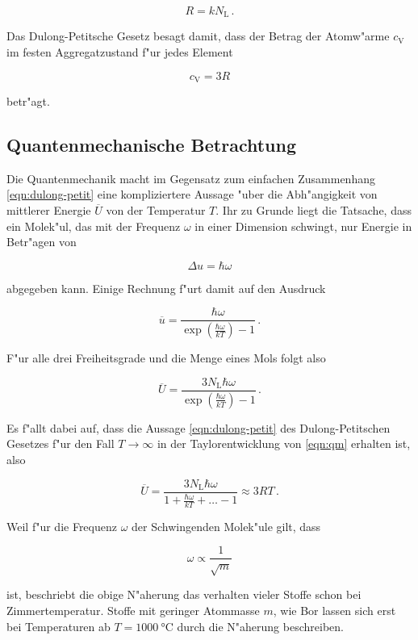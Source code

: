 		\begin{equation*}
			R = kN_\mathrm{L} \,.
		\end{equation*}

		Das Dulong-Petitsche Gesetz besagt damit, dass der Betrag der Atomw"arme $c_\mathrm{V}$ im festen Aggregatzustand f"ur jedes Element

		\begin{equation}
			c_\mathrm{V} = 3R \label{eqn:dulong-petit}
		\end{equation}

		betr"agt.

	\subsection{Quantenmechanische Betrachtung}
	\label{subsec:quantenmechanik}
		Die Quantenmechanik macht im Gegensatz zum einfachen Zusammenhang \eqref{eqn:dulong-petit} eine kompliziertere Aussage "uber die Abh"angigkeit von mittlerer Energie $\overline{U}$ von der Temperatur $T$.
		Ihr zu Grunde liegt die Tatsache, dass ein Molek"ul, das mit der Frequenz $\omega$ in einer Dimension schwingt, nur Energie in Betr"agen von

		\begin{equation*}
			\Delta u = \hbar \omega
		\end{equation*}

		abgegeben kann.	Einige Rechnung f"urt damit auf den Ausdruck

		\begin{equation*}
			\overline{u} = \frac{\hbar \omega}{\exp{\left(\frac{\hbar \omega}{k T}\right)} - 1} \,.
		\end{equation*}

		F"ur alle drei Freiheitsgrade und die Menge eines Mols folgt also

		\begin{equation}
			\label{eqn:qm} \overline{U} = \frac{3 N_\mathrm{L} \hbar \omega}{\exp{\left(\frac{\hbar \omega}{k T}\right)} - 1} \,.
		\end{equation}

		Es f"allt dabei auf, dass die Aussage \eqref{eqn:dulong-petit} des Dulong-Petitschen Gesetzes f"ur den Fall $T \rightarrow \infty$ in der Taylorentwicklung von \eqref{eqn:qm} erhalten ist, also

		\begin{equation*}
			\overline{U} = \frac{3 N_\mathrm{L} \hbar \omega}{1 + \frac{\hbar \omega}{k T} + \dots - 1} \approx 3 RT \,.
		\end{equation*}

		Weil f"ur die Frequenz $\omega$ der Schwingenden Molek"ule gilt, dass

		\begin{equation*}
			\omega \propto \frac{1}{\sqrt{m}}
		\end{equation*}

		ist, beschriebt die obige N"aherung das verhalten vieler Stoffe schon bei Zimmertemperatur.
		Stoffe mit geringer Atommasse $m$, wie Bor lassen sich erst bei Temperaturen ab $T = \SI{1000}{\celsius}$ durch die N"aherung beschreiben.